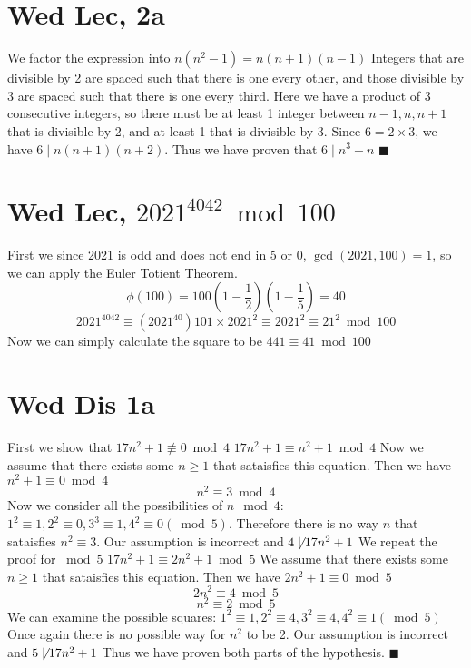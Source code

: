 \documentclass[12pt]{article}
\begin{document}
\section{Wed Lec, 2a}
We factor the expression into $n(n^2-1)=n(n+1)(n-1)$
\newline
Integers that are divisible by 2 are spaced such that there is one every other, and those divisible by 3 are spaced such that there is one every third. Here we have a product of 3 consecutive integers, so there must be at least 1 integer between $n-1, n, n+1$ that is divisible by 2, and at least 1 that is divisible by 3. Since $6=2 \times 3$, we have $6 \mid n(n+1)(n+2)$.
\newline
Thus we have proven that $6 \mid n^3-n$
\newline
$\blacksquare$

\section{Wed Lec, $2021^{4042} \bmod 100$}
First we since 2021 is odd and does not end in 5 or 0, $\gcd(2021,100)=1$, so we can apply the Euler Totient Theorem.
$$\phi(100)=100(1-\frac{1}{2})(1-\frac{1}{5}) = 40$$
$$2021^{4042} \equiv (2021^{40})101 \times 2021^2 \equiv 2021^2 \equiv 21^2 \bmod 100$$
Now we can simply calculate the square to be $441 \equiv 41 \bmod 100$
\newpage


\section{Wed Dis 1a}
First we show that $17n^2+1 \not \equiv 0 \bmod 4$
\newline
$17n^2+1 \equiv n^2+1 \bmod 4$ Now we assume that there exists some $n \geq 1$ that sataisfies this equation. Then we have $n^2+1 \equiv 0 \bmod 4$
$$n^2 \equiv 3 \bmod 4$$
Now we consider all the possibilities of $n \mod 4$: $1^2 \equiv 1, 2^2 \equiv 0, 3^3 \equiv 1, 4^2 \equiv 0 (\bmod 5)$. Therefore there is no way $n$ that sataisfies $n^2\equiv 3$. Our assumption is incorrect and $4 \not \mid 17n^2+1$
\newline
We repeat the proof for $\bmod 5$
\newline
$17n^2+1 \equiv 2n^2+1 \bmod 5$ We assume that there exists some $n \geq 1$ that sataisfies this equation. Then we have $2n^2+1 \equiv 0 \bmod 5$
$$2n^2 \equiv 4 \bmod 5$$
$$n^2 \equiv 2 \bmod 5$$
We can examine the possible squares: $1^2 \equiv 1, 2^2 \equiv 4, 3^2 \equiv 4, 4^2 \equiv 1 (\bmod 5)$ Once again there is no possible way for $n^2$ to be 2. Our assumption is incorrect and $5 \not \mid 17n^2+1$
\newline
Thus we have proven both parts of the hypothesis.
$\blacksquare$
\end{document}
